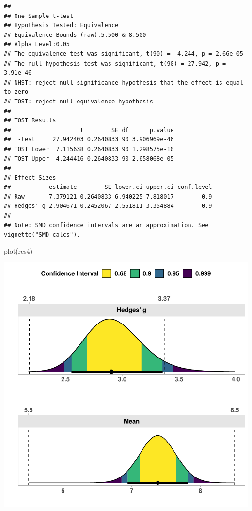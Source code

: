\documentclass[]{interact}
\theoremstyle{plain}%
\theoremstyle{definition}
\theoremstyle{remark}
\newenvironment{Shaded}{\begin{snugshade}}{\end{snugshade}}
\newcommand{\FunctionTok}[1]{\textcolor[rgb]{0.00,0.00,0.00}{#1}}
\newcommand{\NormalTok}[1]{#1}
\begin{document}
\begin{verbatim}
## 
## One Sample t-test
## Hypothesis Tested: Equivalence
## Equivalence Bounds (raw):5.500 & 8.500
## Alpha Level:0.05
## The equivalence test was significant, t(90) = -4.244, p = 2.66e-05
## The null hypothesis test was significant, t(90) = 27.942, p = 3.91e-46
## NHST: reject null significance hypothesis that the effect is equal to zero 
## TOST: reject null equivalence hypothesis
## 
## TOST Results 
##                    t        SE df      p.value
## t-test     27.942403 0.2640833 90 3.906969e-46
## TOST Lower  7.115638 0.2640833 90 1.298575e-10
## TOST Upper -4.244416 0.2640833 90 2.658068e-05
## 
## Effect Sizes 
##           estimate        SE lower.ci upper.ci conf.level
## Raw       7.379121 0.2640833 6.940225 7.818017        0.9
## Hedges' g 2.904671 0.2452067 2.551811 3.354884        0.9
## 
## Note: SMD confidence intervals are an approximation. See vignette("SMD_calcs").
\end{verbatim}

\begin{Shaded}
\begin{Highlighting}[]
\FunctionTok{plot}\NormalTok{(res4)}
\end{Highlighting}
\end{Shaded}

\includegraphics{Avocado_Update_files/figure-latex/unnamed-chunk-13-1.pdf}
\end{document}
